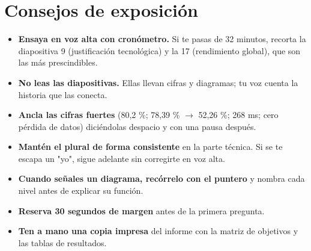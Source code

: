 \documentclass[11pt, a4paper]{article}
\begin{document}
\hrulefill

\section*{Consejos de exposición}

\begin{itemize}[label=-]
    \item \textbf{Ensaya en voz alta con cronómetro.} Si te pasas de 32 minutos, recorta la diapositiva 9 (justificación tecnológica) y la 17 (rendimiento global), que son las más prescindibles.
    \item \textbf{No leas las diapositivas.} Ellas llevan cifras y diagramas; tu voz cuenta la historia que las conecta.
    \item \textbf{Ancla las cifras fuertes} (80,2 \%; 78,39 \% $\rightarrow$ 52,26 \%; 268 ms; cero pérdida de datos) diciéndolas despacio y con una pausa después.
    \item \textbf{Mantén el plural de forma consistente} en la parte técnica. Si se te escapa un "yo", sigue adelante sin corregirte en voz alta.
    \item \textbf{Cuando señales un diagrama, recórrelo con el puntero} y nombra cada nivel antes de explicar su función.
    \item \textbf{Reserva 30 segundos de margen} antes de la primera pregunta.
    \item \textbf{Ten a mano una copia impresa} del informe con la matriz de objetivos y las tablas de resultados.
\end{itemize}
\end{document}
